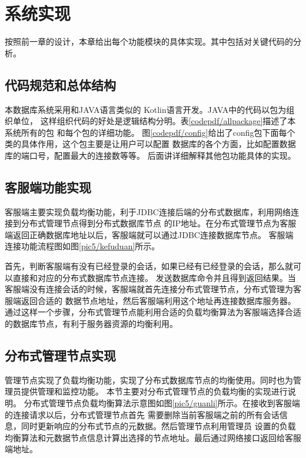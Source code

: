 
\chapter{系统实现}
按照前一章的设计，本章给出每个功能模块的具体实现。其中包括对关键代码的分析。
\section{代码规范和总体结构}
本数据库系统采用和JAVA语言类似的
Kotlin语言开发。JAVA中的代码以包为组织单位，
这样组织代码的好处是逻辑结构分明。表\ref{codepdf/allpackage}描述了本系统所有的包
和每个包的详细功能。
图\ref{codepdf/config}给出了config包下面每个类的具体作用，这个包主要是让用户可以配置
数据库的各个方面，比如配置数据库的端口号，配置最大的连接数等等。
后面讲详细解释其他包功能具体的实现。
\section{客服端功能实现}
客服端主要实现负载均衡功能，利于JDBC连接后端的分布式数据库，利用网络连接到分布式管理节点得到分布式数据库节点
的IP地址。在分布式管理节点为客服端返回正确数据库地址以后，客服端就可以通过JDBC连接数据库节点。
客服端连接功能流程图如图\ref{pic5/kefuduan}所示。

首先，判断客服端有没有已经登录的会话，如果已经有已经登录的会话，那么就可以直接和对应的分布式数据库节点连接。
发送数据库命令并且得到返回结果。当客服端没有连接会话的时候，客服端就首先连接分布式管理节点，分布式管理为客服端返回合适的
数据节点地址，然后客服端利用这个地址再连接数据库服务器。
通过这样一个步骤，分布式管理节点能利用合适的负载均衡算法为客服端选择合适的数据库节点，有利于服务器资源的均衡利用。
\section{分布式管理节点实现}
管理节点实现了负载均衡功能，实现了分布式数据库节点的均衡使用。同时也为管理员提供管理和监控功能。
本节主要对分布式管理节点的负载均衡的实现进行说明。
分布式管理节点负载均衡算法示意图如图\ref{pic5/guanli}所示。在接收到客服端的连接请求以后，分布式管理节点首先
需要删除当前客服端之前的所有会话信息，同时更新响应的分布式节点的元数据。然后管理节点利用管理员
设置的负载均衡算法和元数据节点信息计算出选择的节点地址。最后通过网络接口返回给客服端地址。
